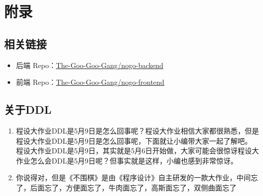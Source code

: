 \documentclass[UTF8]{ctexart}
\begin{document}
\section{附录}
\subsection{相关链接}
\begin{itemize}
	\item 后端 Repo：\href{https://github.com/The-Goo-Goo-Gang/nogo-backend}{The-Goo-Goo-Gang/nogo-backend}
	\item 前端 Repo：\href{https://github.com/The-Goo-Goo-Gang/nogo-frontend}{The-Goo-Goo-Gang/nogo-frontend}
\end{itemize}
\subsection{关于DDL}
\begin{enumerate}
	\item 程设大作业DDL是5月9日是怎么回事呢？程设大作业相信大家都很熟悉，但是程设大作业DDL是5月9日是怎么回事呢，下面就让小编带大家一起了解吧。\\程设大作业DDL是5月9日，其实就是5月6日开始做，大家可能会很惊讶程设大作业怎么会DDL是5月9日呢？但事实就是这样，小编也感到非常惊讶。
	\item 你说得对，但是《不围棋》是由《程序设计\uppercase\expandafter{}》自主研发的一款大作业，中间忘了，后面忘了，方便面忘了，牛肉面忘了，高斯面忘了，双侧曲面忘了
\end{enumerate}
\end{document}
